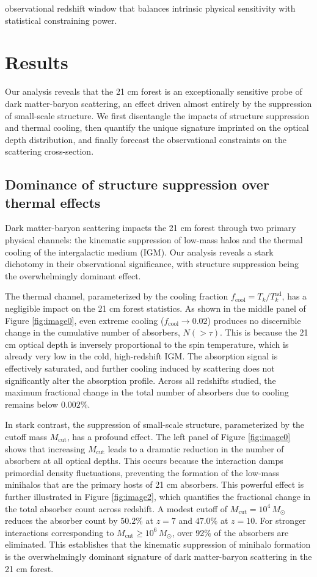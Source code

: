 \documentclass[]{article}
\begin{document}
observational redshift window that balances intrinsic physical sensitivity with statistical constraining power.

\section{Results}
\label{sec:results}
Our analysis reveals that the 21 cm forest is an exceptionally sensitive probe of dark matter-baryon scattering, an effect driven almost entirely by the suppression of small-scale structure. We first disentangle the impacts of structure suppression and thermal cooling, then quantify the unique signature imprinted on the optical depth distribution, and finally forecast the observational constraints on the scattering cross-section.

\subsection{Dominance of structure suppression over thermal effects}

Dark matter-baryon scattering impacts the 21 cm forest through two primary physical channels: the kinematic suppression of low-mass halos and the thermal cooling of the intergalactic medium (IGM). Our analysis reveals a stark dichotomy in their observational significance, with structure suppression being the overwhelmingly dominant effect.

The thermal channel, parameterized by the cooling fraction $f_{\text{cool}} = T_k / T_k^{\text{ad}}$, has a negligible impact on the 21 cm forest statistics. As shown in the middle panel of Figure \ref{fig:image0}, even extreme cooling ($f_{\text{cool}} \to 0.02$) produces no discernible change in the cumulative number of absorbers, $N(>\tau)$. This is because the 21 cm optical depth is inversely proportional to the spin temperature, which is already very low in the cold, high-redshift IGM. The absorption signal is effectively saturated, and further cooling induced by scattering does not significantly alter the absorption profile. Across all redshifts studied, the maximum fractional change in the total number of absorbers due to cooling remains below $0.002\%$.

In stark contrast, the suppression of small-scale structure, parameterized by the cutoff mass $M_{\text{cut}}$, has a profound effect. The left panel of Figure \ref{fig:image0} shows that increasing $M_{\text{cut}}$ leads to a dramatic reduction in the number of absorbers at all optical depths. This occurs because the interaction damps primordial density fluctuations, preventing the formation of the low-mass minihalos that are the primary hosts of 21 cm absorbers. This powerful effect is further illustrated in Figure \ref{fig:image2}, which quantifies the fractional change in the total absorber count across redshift. A modest cutoff of $M_{\text{cut}} = 10^4 \, M_\odot$ reduces the absorber count by $50.2\%$ at $z=7$ and $47.0\%$ at $z=10$. For stronger interactions corresponding to $M_{\text{cut}} \ge 10^6 \, M_\odot$, over 92\% of the absorbers are eliminated. This establishes that the kinematic suppression of minihalo formation is the overwhelmingly dominant signature of dark matter-baryon scattering in the 21 cm forest.
\end{document}
